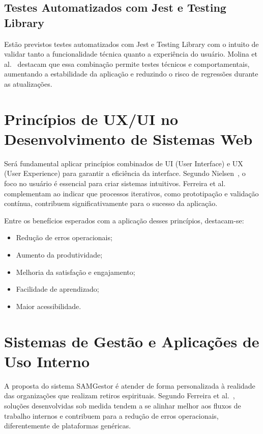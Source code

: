 \subsection{Testes Automatizados com Jest e Testing Library}

Estão previstos testes automatizados com Jest e Testing Library com o intuito de validar tanto a funcionalidade técnica quanto a experiência do usuário. Molina et al.~\cite{molina2020} destacam que essa combinação permite testes técnicos e comportamentais, aumentando a estabilidade da aplicação e reduzindo o risco de regressões durante as atualizações.

\section{Princípios de UX/UI no Desenvolvimento de Sistemas Web}

Será fundamental aplicar princípios combinados de UI (User Interface) e UX (User Experience) para garantir a eficiência da interface. Segundo Nielsen~\cite{nielsen1995}, o foco no usuário é essencial para criar sistemas intuitivos. Ferreira et al.~\cite{ferreira2018} complementam ao indicar que processos iterativos, como prototipação e validação contínua, contribuem significativamente para o sucesso da aplicação.

Entre os benefícios esperados com a aplicação desses princípios, destacam-se:
\begin{itemize}
\item Redução de erros operacionais;
\item Aumento da produtividade;
\item Melhoria da satisfação e engajamento;
\item Facilidade de aprendizado;
\item Maior acessibilidade.
\end{itemize}

\section{Sistemas de Gestão e Aplicações de Uso Interno}

A proposta do sistema SAMGestor é atender de forma personalizada à realidade das organizações que realizam retiros espirituais. Segundo Ferreira et al.~\cite{ferreira2018}, soluções desenvolvidas sob medida tendem a se alinhar melhor aos fluxos de trabalho internos e contribuem para a redução de erros operacionais, diferentemente de plataformas genéricas.

